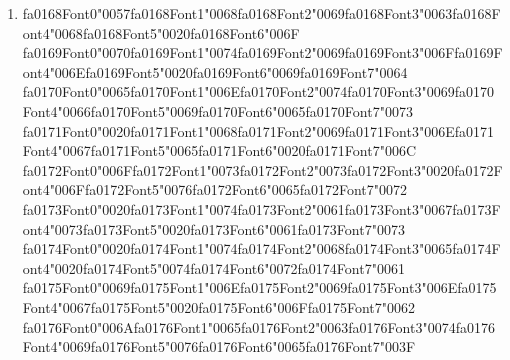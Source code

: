 \documentclass[12pt]{article}
\begin{document}
\begin{enumerate}[label=Q\arabic*.]
 \item {\csname fa0168Font0\endcsname\char"0057}{\csname fa0168Font1\endcsname\char"0068}{\csname fa0168Font2\endcsname\char"0069}{\csname fa0168Font3\endcsname\char"0063}{\csname fa0168Font4\endcsname\char"0068}{\csname fa0168Font5\endcsname\char"0020}{\csname fa0168Font6\endcsname\char"006F} {\csname fa0169Font0\endcsname\char"0070}{\csname fa0169Font1\endcsname\char"0074}{\csname fa0169Font2\endcsname\char"0069}{\csname fa0169Font3\endcsname\char"006F}{\csname fa0169Font4\endcsname\char"006E}{\csname fa0169Font5\endcsname\char"0020}{\csname fa0169Font6\endcsname\char"0069}{\csname fa0169Font7\endcsname\char"0064} {\csname fa0170Font0\endcsname\char"0065}{\csname fa0170Font1\endcsname\char"006E}{\csname fa0170Font2\endcsname\char"0074}{\csname fa0170Font3\endcsname\char"0069}{\csname fa0170Font4\endcsname\char"0066}{\csname fa0170Font5\endcsname\char"0069}{\csname fa0170Font6\endcsname\char"0065}{\csname fa0170Font7\endcsname\char"0073} {\csname fa0171Font0\endcsname\char"0020}{\csname fa0171Font1\endcsname\char"0068}{\csname fa0171Font2\endcsname\char"0069}{\csname fa0171Font3\endcsname\char"006E}{\csname fa0171Font4\endcsname\char"0067}{\csname fa0171Font5\endcsname\char"0065}{\csname fa0171Font6\endcsname\char"0020}{\csname fa0171Font7\endcsname\char"006C} {\csname fa0172Font0\endcsname\char"006F}{\csname fa0172Font1\endcsname\char"0073}{\csname fa0172Font2\endcsname\char"0073}{\csname fa0172Font3\endcsname\char"0020}{\csname fa0172Font4\endcsname\char"006F}{\csname fa0172Font5\endcsname\char"0076}{\csname fa0172Font6\endcsname\char"0065}{\csname fa0172Font7\endcsname\char"0072} {\csname fa0173Font0\endcsname\char"0020}{\csname fa0173Font1\endcsname\char"0074}{\csname fa0173Font2\endcsname\char"0061}{\csname fa0173Font3\endcsname\char"0067}{\csname fa0173Font4\endcsname\char"0073}{\csname fa0173Font5\endcsname\char"0020}{\csname fa0173Font6\endcsname\char"0061}{\csname fa0173Font7\endcsname\char"0073} {\csname fa0174Font0\endcsname\char"0020}{\csname fa0174Font1\endcsname\char"0074}{\csname fa0174Font2\endcsname\char"0068}{\csname fa0174Font3\endcsname\char"0065}{\csname fa0174Font4\endcsname\char"0020}{\csname fa0174Font5\endcsname\char"0074}{\csname fa0174Font6\endcsname\char"0072}{\csname fa0174Font7\endcsname\char"0061} {\csname fa0175Font0\endcsname\char"0069}{\csname fa0175Font1\endcsname\char"006E}{\csname fa0175Font2\endcsname\char"0069}{\csname fa0175Font3\endcsname\char"006E}{\csname fa0175Font4\endcsname\char"0067}{\csname fa0175Font5\endcsname\char"0020}{\csname fa0175Font6\endcsname\char"006F}{\csname fa0175Font7\endcsname\char"0062} {\csname fa0176Font0\endcsname\char"006A}{\csname fa0176Font1\endcsname\char"0065}{\csname fa0176Font2\endcsname\char"0063}{\csname fa0176Font3\endcsname\char"0074}{\csname fa0176Font4\endcsname\char"0069}{\csname fa0176Font5\endcsname\char"0076}{\csname fa0176Font6\endcsname\char"0065}{\csname fa0176Font7\endcsname\char"003F}

\end{enumerate}
\end{document}
